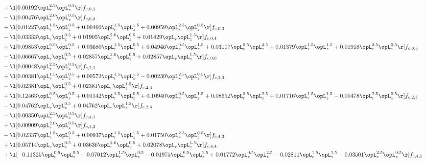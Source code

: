 \begin{alignat}{2}
& + \l[  0.00192 \opL_r^{2.5} \opL_z^{0.5}  \r] f_{c,0,1} \nonumber \\ 
& - \l[  0.00476 \opL_r^{2.0} \opL_z^{0.5}  \r] f_{c,0,2} \nonumber \\ 
& + \l[  0.01227 \opL_r^{1.5} \opL_z^{0.5} +  0.00460 \opL_r^{1.5} \opL_z^{1.5} +  0.00959 \opL_r^{2.5} \opL_z^{0.5}  \r] f_{c,0,3} \nonumber \\ 
& - \l[  0.03333 \opL_r \opL_z^{0.5} +  0.01905 \opL_r^{2.0} \opL_z^{0.5} +  0.01429 \opL_r \opL_z^{1.5}  \r] f_{c,0,4} \nonumber \\ 
& + \l[  0.09853 \opL_r^{0.5} \opL_z^{0.5} +  0.03680 \opL_r^{1.5} \opL_z^{0.5} +  0.04946 \opL_r^{0.5} \opL_z^{1.5} +  0.03107 \opL_r^{0.5} \opL_z^{2.5} +  0.01379 \opL_r^{1.5} \opL_z^{1.5} +  0.01918 \opL_r^{2.5} \opL_z^{0.5}  \r] f_{c,0,5} \nonumber \\ 
& - \l[  0.06667 \opL_r \opL_z^{0.5} +  0.02857 \opL_r^{2.0} \opL_z^{0.5} +  0.02857 \opL_r \opL_z^{1.5}  \r] f_{c,0,6} \nonumber \\ 
& - \l[  0.00048 \opL_r^{2.5} \opL_z^{0.5}  \r] f_{c,2,1} \nonumber \\ 
& + \l[  0.00381 \opL_r^{1.5} \opL_z^{0.5} +  0.00572 \opL_r^{1.5} \opL_z^{1.5}   -0.00239 \opL_r^{2.5} \opL_z^{0.5}  \r] f_{c,2,3} \nonumber \\ 
& - \l[  0.02381 \opL_r \opL_z^{0.5} +  0.02381 \opL_r \opL_z^{1.5}  \r] f_{c,2,4} \nonumber \\ 
& + \l[  0.12463 \opL_r^{0.5} \opL_z^{0.5} +  0.01142 \opL_r^{1.5} \opL_z^{0.5} +  0.10940 \opL_r^{0.5} \opL_z^{1.5} +  0.08652 \opL_r^{0.5} \opL_z^{2.5} +  0.01716 \opL_r^{1.5} \opL_z^{1.5}   -0.00478 \opL_r^{2.5} \opL_z^{0.5}  \r] f_{c,2,5} \nonumber \\ 
& - \l[  0.04762 \opL_r \opL_z^{0.5} +  0.04762 \opL_r \opL_z^{1.5}  \r] f_{c,2,6} \nonumber \\ 
& - \l[  0.00350 \opL_r^{2.5} \opL_z^{0.5}  \r] f_{c,4,1} \nonumber \\ 
& + \l[  0.00909 \opL_r^{2.0} \opL_z^{0.5}  \r] f_{c,4,2} \nonumber \\ 
& - \l[  0.02337 \opL_r^{1.5} \opL_z^{0.5} +  0.00937 \opL_r^{1.5} \opL_z^{1.5} +  0.01750 \opL_r^{2.5} \opL_z^{0.5}  \r] f_{c,4,3} \nonumber \\ 
& + \l[  0.05714 \opL_r \opL_z^{0.5} +  0.03636 \opL_r^{2.0} \opL_z^{0.5} +  0.02078 \opL_r \opL_z^{1.5}  \r] f_{c,4,4} \nonumber \\ 
& + \l[  -0.11325 \opL_r^{0.5} \opL_z^{0.5}   -0.07012 \opL_r^{1.5} \opL_z^{0.5}   -0.01975 \opL_r^{0.5} \opL_z^{1.5} +  0.01772 \opL_r^{0.5} \opL_z^{2.5}   -0.02811 \opL_r^{1.5} \opL_z^{1.5}   -0.03501 \opL_r^{2.5} \opL_z^{0.5}  \r] f_{c,4,5} \nonumber \\ 

\end{alignat}
